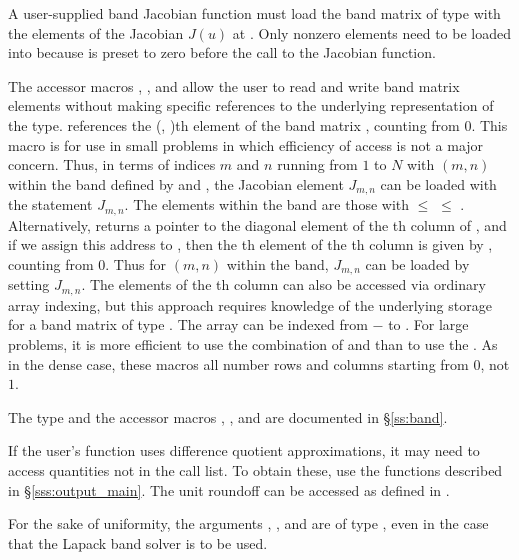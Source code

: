 {
  A user-supplied band Jacobian function must load the band matrix 
  of type  with the elements of the Jacobian $J(u)$ at .
  Only nonzero elements need to be loaded into
   because  is preset to zero before the call to the
  Jacobian function.  

  The accessor macros , , and  
  allow the user to read and write band matrix elements without making specific 
  references to the underlying representation of the  type.
   references the (, )th element of the 
  band matrix , counting from $0$.
  This macro is for use in small problems in which efficiency of access is not
  a major concern.  Thus, in terms of indices $m$ and $n$ running from $1$ to
  $N$ with $(m,n)$ within the band defined by  and
  , the Jacobian element $J_{m,n}$ can be loaded with the 
  statement  $J_{m,n}$. The elements within
  the band are those with  $\le$  $\le$ .
  Alternatively,  returns a pointer to the diagonal element
  of the th column of , and if we assign this address to 
  , then the th element of the th column is
  given by , counting from $0$.
  Thus for $(m,n)$ within the band, $J_{m,n}$ can be loaded by setting 
   
  $J_{m,n}$.  The elements of the th column can also be accessed
  via ordinary array indexing, but this approach requires knowledge of
  the underlying storage for a band matrix of type .  
  The array  can be indexed from $-$ to .
  For large problems, it is more efficient to use the combination of
   and  than to use the
  .  As in the dense case, these macros all number rows
  and columns starting from $0$, not $1$.  

  The  type and the accessor macros , ,
  and  are documented in \S\ref{ss:band}.

  If the user's  function uses difference quotient approximations,
  it may need to access quantities not in the call list. To obtain these, use the
   functions described in \S\ref{sss:output_main}. The unit roundoff
  can be accessed as  defined in .

  For the sake of uniformity, the arguments , , and  are
  of type , even in the case that the Lapack band solver is to be used.
}

